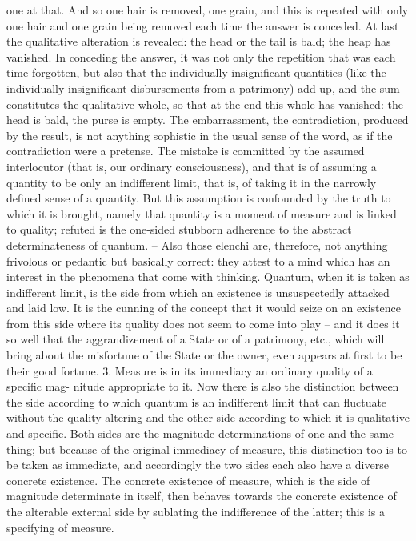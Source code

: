 one at that. And so one hair is removed, one grain, and this is repeated
with only one hair and one grain being removed each time the answer is
conceded. At last the qualitative alteration is revealed: the head or the tail
is bald; the heap has vanished. In conceding the answer, it was not only
the repetition that was each time forgotten, but also that the individually
insignificant quantities (like the individually insignificant disbursements
from a patrimony) add up, and the sum constitutes the qualitative whole,
so that at the end this whole has vanished: the head is bald, the purse is
empty.
The embarrassment, the contradiction, produced by the result, is not
anything sophistic in the usual sense of the word, as if the contradiction
were a pretense. The mistake is committed by the assumed interlocutor
(that is, our ordinary consciousness), and that is of assuming a quantity to
be only an indifferent limit, that is, of taking it in the narrowly defined
sense of a quantity. But this assumption is confounded by the truth to
which it is brought, namely that quantity is a moment of measure and
is linked to quality; refuted is the one-sided stubborn adherence to the
abstract determinateness of quantum. – Also those elenchi are, therefore,
not anything frivolous or pedantic but basically correct: they attest to a
mind which has an interest in the phenomena that come with thinking.
Quantum, when it is taken as indifferent limit, is the side from which
an existence is unsuspectedly attacked and laid low. It is the cunning of
the concept that it would seize on an existence from this side where its
quality does not seem to come into play – and it does it so well that the
aggrandizement of a State or of a patrimony, etc., which will bring about
the misfortune of the State or the owner, even appears at first to be their
good fortune.
3. Measure is in its immediacy an ordinary quality of a specific mag-
nitude appropriate to it. Now there is also the distinction between the
side according to which quantum is an indifferent limit that can fluctuate
without the quality altering and the other side according to which it is
qualitative and specific. Both sides are the magnitude determinations of
one and the same thing; but because of the original immediacy of measure,
this distinction too is to be taken as immediate, and accordingly the two
sides each also have a diverse concrete existence. The concrete existence of
measure, which is the side of magnitude determinate in itself, then behaves
towards the concrete existence of the alterable external side by sublating
the indifference of the latter; this is a specifying of measure.

